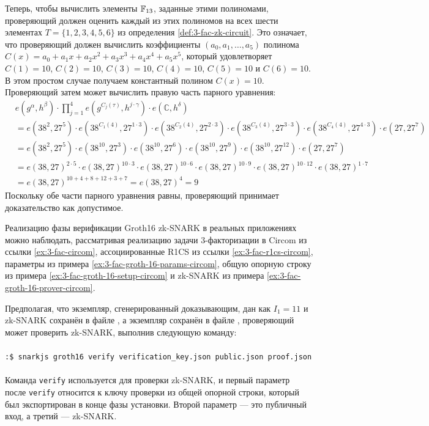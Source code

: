 Теперь, чтобы вычислить элементы $\mathbb{F}_{13}$, заданные этими полиномами, проверяющий должен оценить каждый из этих полиномов на всех шести элементах $T=\{1,2,3,4,5,6\}$ из определения \ref{def:3-fac-zk-circuit}. Это означает, что проверяющий должен вычислить коэффициенты $(a_0,a_1,\ldots,a_5)$ полинома $C(x)=a_0+a_1x+a_2x^2+a_3x^3+a_4x^4+a_5x^5$, который удовлетворяет $C(1)=10$, $C(2)=10$, $C(3)=10$, $C(4)=10$, $C(5)=10$ и $C(6)=10$. В этом простом случае получаем константный полином $C(x)=10$. Проверяющий затем может вычислить правую часть парного уравнения:
\begin{align*}
& e(g^{\alpha},h^{\beta}) \cdot \prod_{j=1}^{4} e(g^{C_j(\tau)},h^{j\cdot \gamma}) \cdot e(\mathbb{C},h^{\delta})\\
& = e(38^2,27^5) \cdot e(38^{C_1(4)},27^{1\cdot 3})\cdot e(38^{C_2(4)},27^{2\cdot 3})\cdot e(38^{C_3(4)},27^{3\cdot 3})\cdot e(38^{C_4(4)},27^{4\cdot 3}) \cdot e(27,27^7)\\
& = e(38^2,27^5) \cdot e(38^{10},27^{3})\cdot e(38^{10},27^{6})\cdot e(38^{10},27^{9})\cdot e(38^{10},27^{12}) \cdot e(27,27^7)\\
& = e(38,27)^{2\cdot 5} \cdot e(38,27)^{10\cdot 3}\cdot e(38,27)^{10\cdot 6}\cdot e(38,27)^{10\cdot 9}\cdot e(38,27)^{10\cdot 12} \cdot e(38,27)^{1\cdot 7}\\
& = e(38,27)^{10 + 4 + 8 + 12 + 3 + 7} = e(38,27)^{4} = 9
\end{align*}
Поскольку обе части парного уравнения равны, проверяющий принимает доказательство как допустимое.

\begin{example}
\label{ex:3-fac-groth-16-verify-circom}
Реализацию фазы верификации Groth16 zk-SNARK в реальных приложениях можно наблюдать, рассматривая реализацию задачи 3-факторизации в Circom из ссылки \ref{ex:3-fac-circom}, ассоциированные R1CS из ссылки \ref{ex:3-fac-r1cs-circom}, параметры из примера \ref{ex:3-fac-groth-16-params-circom}, общую опорную строку из примера \ref{ex:3-fac-groth-16-setup-circom} и zk-SNARK из примера \ref{ex:3-fac-groth-16-prover-circom}.

Предполагая, что экземпляр, сгенерированный доказывающим, дан как $I_1=11$ и zk-SNARK сохранён в файле , а экземпляр сохранён в файле , проверяющий может проверить zk-SNARK, выполнив следующую команду:
\\
\\
\texttt{:\$ snarkjs groth16 verify verification\_key.json public.json proof.json}
\\
\\
Команда \texttt{verify} используется для проверки zk-SNARK, и первый параметр после \texttt{verify} относится к ключу проверки из общей опорной строки, который был экспортирован в конце фазы установки. Второй параметр — это публичный вход, а третий — zk-SNARK.
\end{example}

